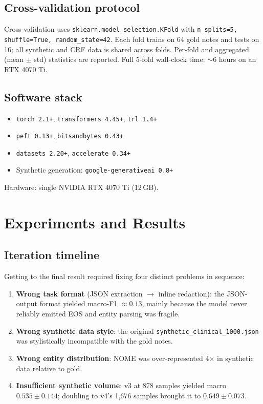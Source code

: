 \documentclass[11pt,a4paper]{article}
\begin{document}
\subsection{Cross-validation protocol}

Cross-validation uses \texttt{sklearn.model\_selection.KFold} with \texttt{n\_splits=5, shuffle=True, random\_state=42}. Each fold trains on 64 gold notes and tests on 16; all synthetic and CRF data is shared across folds. Per-fold and aggregated (mean $\pm$ std) statistics are reported. Full 5-fold wall-clock time: $\sim$6 hours on an RTX 4070 Ti.

\subsection{Software stack}

\begin{itemize}[leftmargin=*,topsep=2pt,itemsep=0pt]
\item \texttt{torch 2.1+}, \texttt{transformers 4.45+}, \texttt{trl 1.4+}
\item \texttt{peft 0.13+}, \texttt{bitsandbytes 0.43+}
\item \texttt{datasets 2.20+}, \texttt{accelerate 0.34+}
\item Synthetic generation: \texttt{google-generativeai 0.8+}
\end{itemize}

Hardware: single NVIDIA RTX 4070 Ti (12\,GB).

\section{Experiments and Results}
\label{sec:experiments}

\subsection{Iteration timeline}

Getting to the final result required fixing four distinct problems in sequence:
\begin{enumerate}[leftmargin=*,topsep=2pt,itemsep=0pt]
\item \textbf{Wrong task format} (JSON extraction $\to$ inline redaction): the JSON-output format yielded macro-F1 $\approx 0.13$, mainly because the model never reliably emitted EOS and entity parsing was fragile.
\item \textbf{Wrong synthetic data style}: the original \texttt{synthetic\_clinical\_1000.json} was stylistically incompatible with the gold notes.
\item \textbf{Wrong entity distribution}: NOME was over-represented 4$\times$ in synthetic data relative to gold.
\item \textbf{Insufficient synthetic volume}: v3 at 878 samples yielded macro $0.535 \pm 0.144$; doubling to v4's 1{,}676 samples brought it to $0.649 \pm 0.073$.
\end{enumerate}
\end{document}
